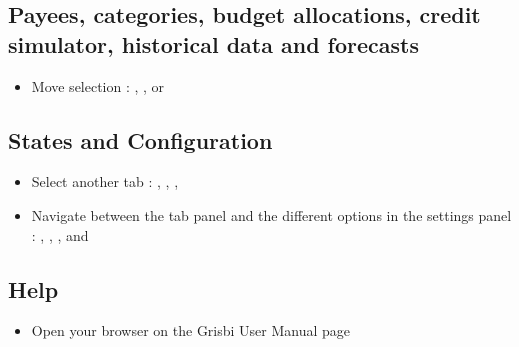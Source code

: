 \subsection{Payees, categories, budget allocations, credit simulator, historical data and forecasts}

\begin{itemize}
	\item Move selection : , ,  or 
\end{itemize}


\subsection{States and Configuration}

\begin{itemize}
	\item Select another tab : , , , 
	\item Navigate between the tab panel and the different options in the settings panel : , , ,  and 
\end{itemize}

\subsection{Help}

\begin{itemize}
	\item Open your browser on the Grisbi User Manual page 
\end{itemize}













